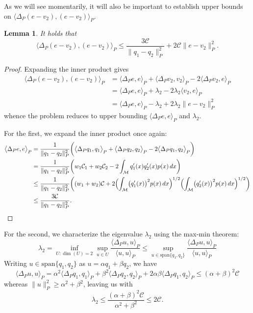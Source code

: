 \documentclass{article}
\newcommand{\1}{\mathbf{1}}
\newcommand{\mc}[1]{\mathcal{#1}}
\newcommand{\dotp}[2]{\langle #1, #2 \rangle}
\theoremstyle{alden}
\theoremstyle{aldenthm}
\newtheorem{lemma}{Lemma}
\theoremstyle{definition}
\theoremstyle{remark}
\begin{document}
As we will see momentarily, it will also be important to establish upper bounds on $\langle \Delta_P(e - v_2), (e - v_2) \rangle_P$.
\begin{lemma}
	It holds that
	\begin{equation}
	\label{eqn:dirichlet_energy_perturbation_1}
	\bigl\langle \Delta_P(e - v_2), (e - v_2) \bigr\rangle_P \leq \frac{3\mc{C}}{\|q_1 - q_2\|_P^2} + 2\mc{C}\|e - v_2\|_P^2.
	\end{equation}
\end{lemma}
\begin{proof}
	Expanding the inner product gives
	\begin{align*}
	\bigl\langle \Delta_P(e - v_2), (e - v_2) \bigr\rangle_P & = \bigl\langle \Delta_Pe, e \bigr\rangle_P + \bigl\langle \Delta_Pv_2, v_2 \bigr\rangle_P - 2\bigl\langle \Delta_Pv_2, e \bigr\rangle_P \\
	& = \bigl\langle \Delta_Pe, e \bigr\rangle_P + \lambda_2 - 2\lambda_2 \bigl\langle v_2, e \bigr\rangle_P \\
	& = \bigl\langle \Delta_Pe, e \bigr\rangle_P - \lambda_2 + 2\lambda_2 \|e - v_2\|_P^2
 	\end{align*}
 	whence the problem reduces to upper bounding $\bigl\langle \Delta_Pe, e \bigr\rangle_P$ and $\lambda_2$. 
 	
 	For the first, we expand the inner product once again:
 	\begin{align*}
	\bigl\langle \Delta_Pe, e \bigr\rangle_P & = \frac{1}{\|q_1 - q_2\|_P^2}\biggl(\bigl\langle \Delta_Pq_1, q_1 \bigr\rangle_P + \bigl\langle \Delta_Pq_2, q_2 \bigr\rangle_P - 2 \bigl\langle \Delta_Pq_1, q_2 \bigr\rangle_P\biggr) \\
	& = \frac{1}{\|q_1 - q_2\|_P^2}\biggl(w_1\mc{C}_1 + w_2\mc{C}_2 - 2\int_{\mc{M}} q_1'(x) q_2'(x) p(x) \,dx\biggr) \\
	& \leq \frac{1}{\|q_1 - q_2\|_P^2} \biggl((w_1 + w_2)\mc{C} + 2\Bigl(\int_{\mc{M}} \bigl(q_1'(x)\bigr)^2 p(x)\,dx\Bigr)^{1/2}\Bigl(\int_{\mc{M}} \bigl(q_2'(x)\bigr)^2 p(x)\,dx\Bigr)^{1/2}\biggr) \\
	& \leq \frac{3\mc{C}}{\|q_1 - q_2\|_P^2}.
 	\end{align*}
\end{proof}
For the second, we characterize the eigenvalue $\lambda_2$ using the max-min theorem:
\begin{equation*}
\lambda_2 = \inf_{U: \dim(U) = 2} \sup_{u \in U} \frac{\dotp{\Delta_Pu}{u}_P}{\dotp{u}{u}_P} \leq \sup_{u \in \mathrm{span}\{q_1,q_2\}} \frac{\dotp{\Delta_Pu}{u}_P}{\dotp{u}{u}_P}
\end{equation*}
Writing $u \in \mathrm{span}\{q_1,q_2\}$ as $u = \alpha q_1 + \beta q_2$, we have 
\begin{equation*}
\dotp{\Delta_Pu}{u}_P = \alpha^2\dotp{\Delta_Pq_1}{q_1}_P + \beta^2\dotp{\Delta_Pq_2}{q_2}_P + 2\alpha\beta\dotp{\Delta_Pq_1}{q_2}_{P} \leq (\alpha + \beta)^2 \mc{C}
\end{equation*}
whereas $\|u\|_P^2 \geq \alpha^2 + \beta^2$, leaving us with 
\begin{equation*}
\lambda_2 \leq \frac{(\alpha + \beta)^2\mc{C}}{\alpha^2 + \beta^2} \leq 2\mc{C}.
\end{equation*}
\end{document}
